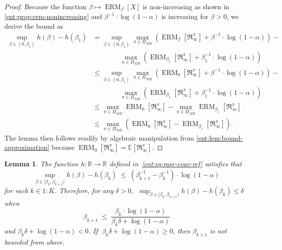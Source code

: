 \documentclass[twoside]{article}
\newcommand{\E}{\mathbb{E}}
\newcommand{\erm}[2]{\operatorname{ERM}_{#1}\left[#2\right]}
\newcommand{\Real}{\mathbb{R}}
\theoremstyle{plain}
\newtheorem{lemma}[theorem]{Lemma}
\theoremstyle{definition}
\theoremstyle{remark}
\begin{document}
\begin{proof}
Because the function $\beta\mapsto \erm{\beta}{X}$ is non-increasing as shown in \cref{ent:prop:erm-nonincreasing} and $\beta^{-1}\cdot \log (1-\alpha)$ is increasing for $\beta>0$, we derive the bound as
\begin{align*}
  \sup_{\beta\in (0,\beta_1)} h(\beta) - h(\beta_1)
  &= \sup_{\beta\in (0,\beta_1)} \max_{\pi\in \Pi_{MR}}  \left(  \erm{\beta}{\mathfrak{R}_{\infty}^{\pi}} + \beta^{-1}\cdot \log (1-\alpha) \right) - \\
  &\qquad  \qquad \max_{\pi\in \Pi_{MR}}  \left(  \erm{\beta_1}{\mathfrak{R}_{\infty}^{\pi}} + \beta_1^{-1}\cdot \log (1-\alpha) \right) \\
  &\le  \sup_{\beta\in (0,\beta_1)} \max_{\pi\in \Pi_{MR}}  \left(  \erm{0}{\mathfrak{R}_{\infty}^{\pi}} + \beta^{-1}\cdot \log (1-\alpha) \right) - \\
 &\qquad \qquad   \max_{\pi\in \Pi_{MR}}  \left(  \erm{\beta_1}{\mathfrak{R}_{\infty}^{\pi}} + \beta_1^{-1}\cdot \log (1-\alpha) \right) \\
&\le  \max_{\pi\in \Pi_{MR}}   \erm{0}{\mathfrak{R}_{\infty}^{\pi}}  - \max_{\pi\in \Pi_{MR}}    \erm{\beta_1}{\mathfrak{R}_{\infty}^{\pi}}  \\
&\le  \max_{\pi\in \Pi_{MR}}  \left(  \erm{0}{\mathfrak{R}_{\infty}^{\pi}}  -   \erm{\beta_1}{\mathfrak{R}_{\infty}^{\pi}}  \right).
\end{align*}
The lemma then follows readily by algebraic manipulation from \cref{ent:lem:bound-approximation} because $\erm{0}{\mathfrak{R}_{\infty}^{\pi}} = \E[\mathfrak{R}_{\infty}^{\pi}]$.
\end{proof}

\begin{lemma} \label{ent:lem:case2}
The function $h\colon \Real \to \Real$  defined in~\eqref{ent:eq:rasr-evar-ref} satisfies that
  \[
    \sup_{\beta \in [\beta_k,\beta_{k+1})} h(\beta) - h(\beta_k) \;\le\; (\beta_{k+1}^{-1} - \beta_k^{-1}) \cdot \log \left(1-\alpha\right) 
  \]
for each $k \in 1{:}K$. Therefore, for any $\delta > 0$, $\;\sup_{\beta \in [\beta_k,\beta_{k+1})} h(\beta) - h(\beta_k) \le \delta\;$ when
%
\begin{equation}\label{ent:eq:beta-bound-ref}
\beta_{k+1} \;\le\; \frac{\beta_k \cdot \log (1-\alpha)}{\beta_{k}\delta + \log (1-\alpha) }
\end{equation}
%
and $\beta_k\delta + \log (1-\alpha) < 0$. If $\;\beta_k\delta + \log (1-\alpha) \ge 0$, then $\beta_{k+1}$ is not bounded from above. 
\end{lemma}
\end{document}
